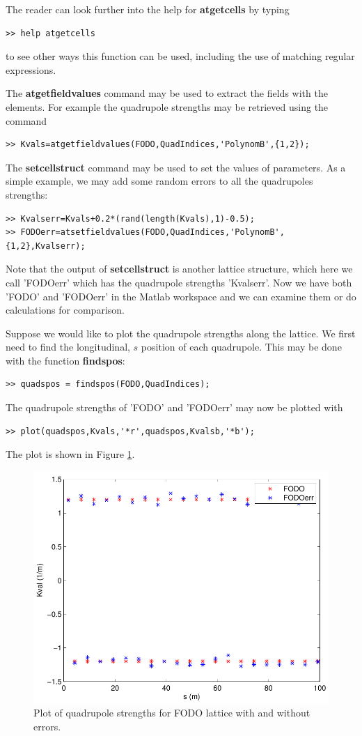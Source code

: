 \documentclass[acus]{article}
\newcommand{\mfun}[1]{{\bf{#1}}}
\begin{document}
The reader can look further into the help for \mfun{atgetcells} by typing
\begin{verbatim}
>> help atgetcells
\end{verbatim}
to see other ways this function can be used, including the use of matching 
regular expressions.

The \mfun{atgetfieldvalues} command may be used to extract the fields with the elements.  For example the quadrupole strengths may be 
retrieved using the command
 \begin{verbatim}
>> Kvals=atgetfieldvalues(FODO,QuadIndices,'PolynomB',{1,2});
\end{verbatim}
The \mfun{setcellstruct} command may be used to set the values of parameters.  As a simple example, we may add some
random errors to all the quadrupoles strengths:
 \begin{verbatim}
>> Kvalserr=Kvals+0.2*(rand(length(Kvals),1)-0.5);
>> FODOerr=atsetfieldvalues(FODO,QuadIndices,'PolynomB',{1,2},Kvalserr);
\end{verbatim}
Note that the output of \mfun{setcellstruct} is another lattice structure, which here we call 'FODOerr' which has the
quadrupole strengths 'Kvalserr'.  Now we have both 'FODO' and 'FODOerr' in the Matlab workspace and we can examine
them or do calculations for comparison.

Suppose we would like to plot the quadrupole strengths along the lattice.  We first need to find the
longitudinal, $s$
position of each quadrupole.  This may be done with the function \mfun{findspos}:
\begin{verbatim}
>> quadspos = findspos(FODO,QuadIndices);
\end{verbatim}
The quadrupole strengths of 'FODO' and 'FODOerr' may now be plotted with
\begin{verbatim}
>> plot(quadspos,Kvals,'*r',quadspos,Kvalsb,'*b');
\end{verbatim}
The plot is shown in Figure \ref{quadplot}.
\begin{figure}[htb]
\centering
\includegraphics[scale=0.5]{quadplot.pdf}
\caption{Plot of quadrupole strengths for FODO lattice with and without errors.}
\label{quadplot}
\end{figure}
\end{document}

